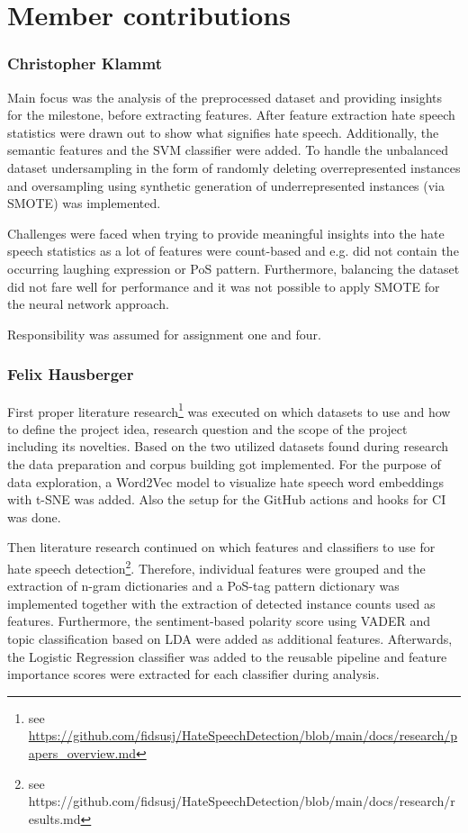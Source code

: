 \section*{Member contributions}

\subsubsection*{Christopher Klammt}

Main focus was the analysis of the preprocessed dataset and providing insights for the milestone, before extracting features. After feature extraction hate speech statistics were drawn out to show what signifies hate speech. Ad\-di\-tio\-nal\-ly, the semantic features and the SVM classifier were added. To handle the unbalanced dataset undersampling in the form of randomly deleting over\-re\-pre\-sen\-ted instances and oversampling using synthetic generation of underrepresented instances (via SMOTE) was implemented.

Challenges were faced when trying to provide meaningful insights into the hate speech statistics as a lot of features were count-based and e.g. did not contain the occurring laughing expression or PoS pattern. Furthermore, balancing the dataset did not fare well for performance and it was not possible to apply SMOTE for the neural network approach.

Responsibility was assumed for assignment one and four.

\subsubsection*{Felix Hausberger}

First proper literature research\footnote{see \url{https://github.com/fidsusj/HateSpeechDetection/blob/main/docs/research/papers_overview.md}} was executed on which datasets to use and how to define the project idea, research question and the scope of the project including its novelties. Based on the two utilized datasets found during research the data preparation and corpus building got implemented. For the purpose of data exploration, a Word2Vec model to visualize hate speech word embeddings with t-SNE was added. Also the setup for the GitHub actions and hooks for CI was done.

Then literature research continued on which features and classifiers to use for hate speech detection\footnote{see https://github.com/fidsusj/HateSpeechDetection/blob/main/docs/research/results.md}. Therefore, individual features were grouped and the extraction of n-gram dictionaries and a PoS-tag pattern dictionary was implemented together with the extraction of detected instance counts used as features. Furthermore, the sentiment-based polarity score using VADER and topic classification based on LDA were added as additional features. Afterwards, the Logistic Regression classifier was added to the reusable pipeline and feature importance scores were extracted for each classifier during analysis.

